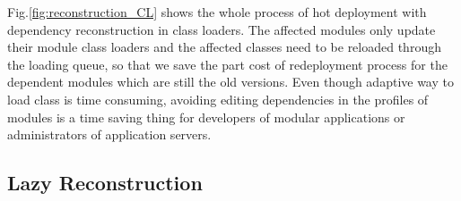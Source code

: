 \documentclass[conference]{IEEEtran}
\begin{document}
Fig.\ref{fig:reconstruction_CL} shows the whole process of hot deployment with dependency reconstruction in class loaders. 
The affected modules only update their module class loaders and the affected classes need to be reloaded through the loading queue, so that we save the part cost of redeployment process for the dependent modules which are still the old versions. 
Even though adaptive way to load class is time consuming, avoiding editing dependencies in the profiles of modules is a time saving thing for developers of modular applications or administrators of application servers.


\subsection{Lazy Reconstruction}
\end{document}

